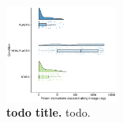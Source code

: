 \begin{figure}[h!]
    \centering
    \includegraphics[width=0.33\textwidth]{media/deleterious-hitchhiking-panel.pdf}
    \caption{\small
    \textbf{todo title.}
    todo.
    }
    \label{fig:deleterious-hitchhiking}
\end{figure}